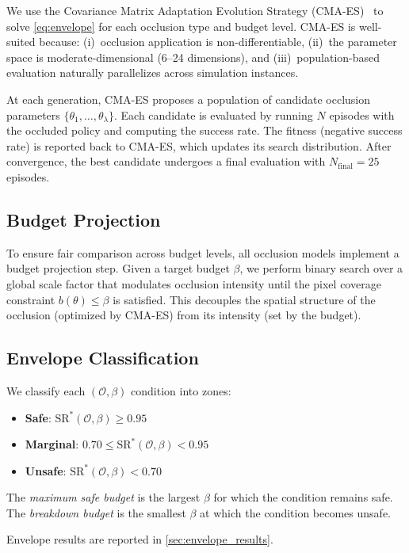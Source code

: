 \documentclass[letterpaper]{IEEEtran}
\begin{document}
We use the Covariance Matrix Adaptation Evolution Strategy (CMA-ES)~\cite{cmaes} to solve \cref{eq:envelope} for each occlusion type and budget level.
CMA-ES is well-suited because: (i)~occlusion application is non-differentiable, (ii)~the parameter space is moderate-dimensional (6--24 dimensions), and (iii)~population-based evaluation naturally parallelizes across simulation instances.

At each generation, CMA-ES proposes a population of candidate occlusion parameters $\{\theta_1, \ldots, \theta_\lambda\}$.
Each candidate is evaluated by running $N$ episodes with the occluded policy and computing the success rate.
The fitness (negative success rate) is reported back to CMA-ES, which updates its search distribution.
After convergence, the best candidate undergoes a final evaluation with $N_{\text{final}} = 25$ episodes.

\subsection{Budget Projection}

To ensure fair comparison across budget levels, all occlusion models implement a budget projection step.
Given a target budget $\beta$, we perform binary search over a global scale factor that modulates occlusion intensity until the pixel coverage constraint $b(\theta) \leq \beta$ is satisfied.
This decouples the spatial structure of the occlusion (optimized by CMA-ES) from its intensity (set by the budget).

\subsection{Envelope Classification}

We classify each $(\mathcal{O}, \beta)$ condition into zones:
\begin{itemize}
    \item \textbf{Safe}: $\text{SR}^*(\mathcal{O}, \beta) \geq 0.95$
    \item \textbf{Marginal}: $0.70 \leq \text{SR}^*(\mathcal{O}, \beta) < 0.95$
    \item \textbf{Unsafe}: $\text{SR}^*(\mathcal{O}, \beta) < 0.70$
\end{itemize}
The \emph{maximum safe budget} is the largest $\beta$ for which the condition remains safe.
The \emph{breakdown budget} is the smallest $\beta$ at which the condition becomes unsafe.

Envelope results are reported in \cref{sec:envelope_results}.
\end{document}
